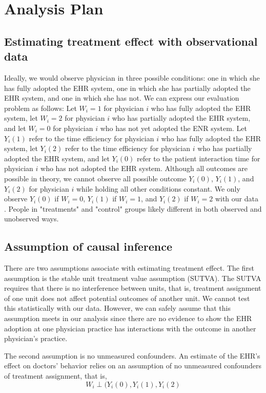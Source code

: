 \documentclass[12pt]{report}
\begin{document}
\chapter{Analysis Plan}
\section{Estimating treatment effect with observational data}
Ideally, we would observe physician in three possible conditions: one in which she has fully adopted the EHR system, one in which she has partially adopted the EHR system, and one in which she has not. We can express our evaluation problem as follows: Let $W_i = 1$ for physician $i$ who has fully adopted the EHR system, let $W_i = 2$ for physician $i$ who has partially adopted the EHR system, and let $W_i = 0$ for physician $i$ who has not yet adopted the ENR system. Let $Y_i(1)$ refer to the time efficiency for physician $i$ who has fully adopted the EHR system, let $Y_i(2)$ refer to the time efficiency for physician $i$ who has partially adopted the EHR system, and let $Y_i(0)$ refer to the patient interaction time for physician $i$ who has not adopted the EHR system. Although all outcomes are possible in theory, we cannot observe all possible outcome $Y_i(0)$, $Y_i(1)$, and $Y_i(2)$ for physician $i$ while holding all other conditions constant. We only observe $Y_i(0)$ if $W_i = 0$, $Y_i(1)$ if $W_i = 1$, and $Y_i(2)$ if $W_i = 2$ with our data \citep{imbens2008recent}. People in "treatments" and "control" groups likely different in both observed and unobserved ways.

\section{Assumption of causal inference}
There are two assumptions associate with estimating treatment effect. The first assumption is the stable unit treatment value assumption (SUTVA). The SUTVA requires that there is no interference between units, that is, treatment assignment of one unit does not affect potential outcomes of another unit. We cannot test this statistically with our data. However, we can safely assume that this assumption meets in our analysis since there are no evidence to show the EHR adoption at one physician practice has interactions with the outcome in another physician's practice.

The second assumption is no unmeasured confounders. An estimate of the EHR's effect on doctors' behavior relies on an assumption of no unmeasured confounders of treatment assignment, that is, 
\begin{equation*}
W_i \perp (Y_i(0),Y_i(1),Y_i(2)
\end{equation*}
\end{document}
